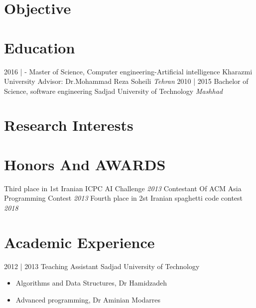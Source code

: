 \documentclass[a4paper]{moderncv}        %
\begin{document}
\makecvtitle
    
\vspace*{-2\baselineskip}


\section{Objective}

\section{Education}

\cventry
{2016 | -}
{Master of Science, Computer engineering-Artificial intelligence}
{Kharazmi University}
{Advisor: Dr.Mohammad Reza Soheili}
{\textit{Tehran}}
{}
\cventry
{2010 | 2015}
{Bachelor of Science, software engineering}
{Sadjad University of Technology}
{}
{\textit{Mashhad}}
{}
\vspace*{-0.5\baselineskip}
\section{Research Interests}


\vspace*{-0.5\baselineskip}
\section{Honors And AWARDS}
\cventry
{}
{Third place in 1st Iranian ICPC AI Challenge}
{}
{\textit{2013}}
{}
{}
\vspace{1mm}
\cventry
{}
{Contestant Of ACM Asia Programming Contest}
{}
{\textit{2013}}
{}
{}
\vspace{1mm}
\cventry
{}
{Fourth place in 2st Iranian spaghetti code contest}
{}
{\textit{2018}}
{}
{}
\vspace{1mm}
\vspace*{-0.5\baselineskip}
\section{Academic Experience}
\cventry
{2012 | 2013}
{Teaching Assistant}
{Sadjad University of Technology}
{}
{}
{\begin{itemize}%
	\item Algorithms and Data Structures, Dr Hamidzadeh
	\item Advanced programming, Dr Aminian Modarres 
	\end{itemize}}
	
\end{document}
